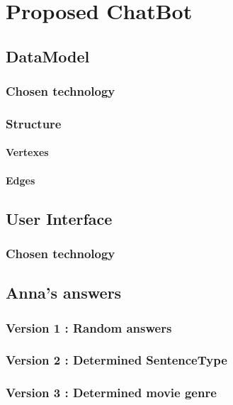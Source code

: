 \section{Proposed ChatBot}
% 
\subsection{DataModel}
\subsubsection{Chosen technology}
\subsubsection{Structure}
\paragraph{Vertexes}
\paragraph{Edges}
% 
\subsection{User Interface}
\subsubsection{Chosen technology}
% 
\subsection{Anna's answers}
\subsubsection{Version 1 : Random answers}
\subsubsection{Version 2 : Determined SentenceType}
\subsubsection{Version 3 : Determined movie genre}
